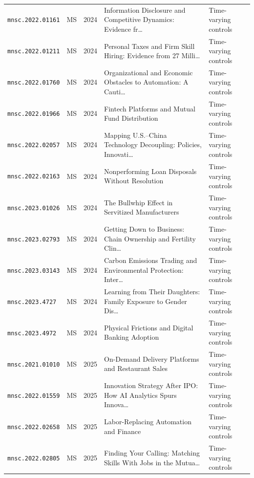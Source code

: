 \begin{longtable}{lccp{}l}
\texttt{mnsc.2022.01161} & MS & 2024 & \raggedright Information Disclosure and Competitive Dynamics: Evidence fr\ldots{} & Time-varying controls \\
\texttt{mnsc.2022.01211} & MS & 2024 & \raggedright Personal Taxes and Firm Skill Hiring: Evidence from 27 Milli\ldots{} & Time-varying controls \\
\texttt{mnsc.2022.01760} & MS & 2024 & \raggedright Organizational and Economic Obstacles to Automation: A Cauti\ldots{} & Time-varying controls \\
\texttt{mnsc.2022.01966} & MS & 2024 & \raggedright Fintech Platforms and Mutual Fund Distribution & Time-varying controls \\
\texttt{mnsc.2022.02057} & MS & 2024 & \raggedright Mapping U.S.--China Technology Decoupling: Policies, Innovati\ldots{} & Time-varying controls \\
\texttt{mnsc.2022.02163} & MS & 2024 & \raggedright Nonperforming Loan Disposals Without Resolution & Time-varying controls \\
\texttt{mnsc.2023.01026} & MS & 2024 & \raggedright The Bullwhip Effect in Servitized Manufacturers & Time-varying controls \\
\texttt{mnsc.2023.02793} & MS & 2024 & \raggedright Getting Down to Business: Chain Ownership and Fertility Clin\ldots{} & Time-varying controls \\
\texttt{mnsc.2023.03143} & MS & 2024 & \raggedright Carbon Emissions Trading and Environmental Protection: Inter\ldots{} & Time-varying controls \\
\texttt{mnsc.2023.4727} & MS & 2024 & \raggedright Learning from Their Daughters: Family Exposure to Gender Dis\ldots{} & Time-varying controls \\
\texttt{mnsc.2023.4972} & MS & 2024 & \raggedright Physical Frictions and Digital Banking Adoption & Time-varying controls \\
\texttt{mnsc.2021.01010} & MS & 2025 & \raggedright On-Demand Delivery Platforms and Restaurant Sales & Time-varying controls \\
\texttt{mnsc.2022.01559} & MS & 2025 & \raggedright Innovation Strategy After IPO: How AI Analytics Spurs Innova\ldots{} & Time-varying controls \\
\texttt{mnsc.2022.02658} & MS & 2025 & \raggedright Labor-Replacing Automation and Finance & Time-varying controls \\
\texttt{mnsc.2022.02805} & MS & 2025 & \raggedright Finding Your Calling: Matching Skills With Jobs in the Mutua\ldots{} & Time-varying controls \\

\end{longtable}
